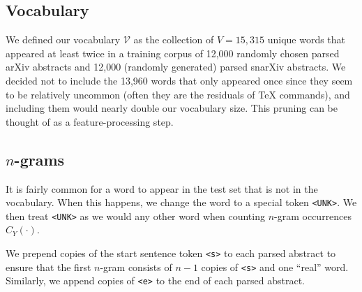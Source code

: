 \documentclass{article}
\newcommand{\V}{\mathcal{V}}
\begin{document}
\subsection{Vocabulary}
We defined our vocabulary $\V$ as the collection of $V=15,315$ unique words that appeared at least twice in a training corpus of 12,000 randomly chosen parsed arXiv abstracts and 12,000 (randomly generated) parsed snarXiv abstracts.
We decided not to include the 13,960 words that only appeared once since they seem to be relatively uncommon (often they are the residuals of TeX commands), and including them would nearly double our vocabulary size.
This pruning can be thought of as a feature-processing step.


\subsection{\texorpdfstring{$n$-grams}{n-grams}}
It is fairly common for a word to appear in the test set that is not in the vocabulary.
When this happens, we change the word to a special token \texttt{<UNK>}.
We then treat \texttt{<UNK>} as we would any other word when counting $n$-gram occurrences $C_Y(\cdot)$.

We prepend copies of the start sentence token \texttt{<s>} to each parsed abstract to ensure that the first $n$-gram consists of $n-1$ copies of \texttt{<s>} and one ``real'' word.
Similarly, we append copies of \texttt{<e>} to the end of each parsed abstract.





\nocite{sahami1998bayesian,ngram-cat,textclass,trivedi2016study,cvxpy,cvxpy_rewriting}



\end{document}
